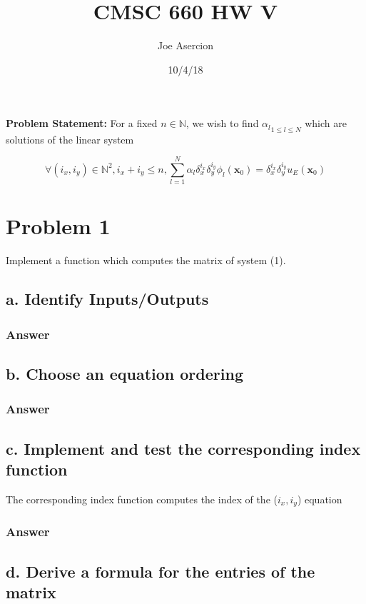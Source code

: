 \documentclass{article}
\title{CMSC 660 HW V}
\date{10/4/18}
\author{Joe Asercion}
\begin{document}
	\maketitle
	\textbf{Problem Statement:} For a fixed $n\in\mathbb{N}$, we wish to find ${\alpha_{l}}_{1\leq l\leq N}$ which are solutions of the linear system
	
	\begin{equation}
		\forall(i_{x},i_{y})\in\mathbb{N}^{2},i_{x}+i_{y}\leq n,\sum_{l=1}^{N}\alpha_{l}\delta_{x}^{i_{x}}\delta_{y}^{i_{y}}\phi_{l}(\mathbf{x}_{0})=\delta_{x}^{i_{x}}\delta_{y}^{i_{y}}u_{E}(\mathbf{x}_0)
	\end{equation}
	\section{Problem 1}
	Implement a function which computes the matrix of system (1).
	\subsection{a.  Identify Inputs/Outputs}
	
	\subsubsection{Answer}
	
	\subsection{b. Choose an equation ordering}
	
	\subsubsection{Answer}
	
	\subsection{c. Implement and test the corresponding index function}
	The corresponding index function computes the index of the ($i_{x},i_{y}$) equation
	
	\subsubsection{Answer}
	
	\subsection{d. Derive a formula for the entries of the matrix}
	
\end{document}
